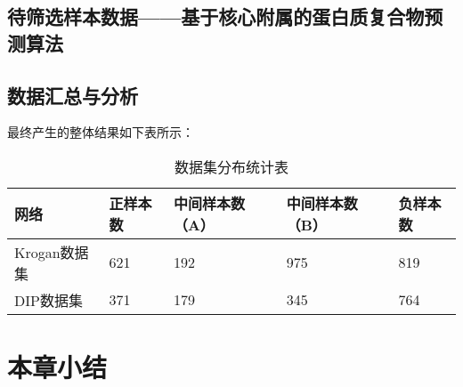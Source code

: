 \subsection{待筛选样本数据——基于核心附属的蛋白质复合物预测算法}
\label{subsection:allSample:coreAttachSampleData}
\subsection{数据汇总与分析}
\label{subsection:allSample:summary}

最终产生的整体结果如下表所示：

\begin{table}[h]
    \centering
    \caption{数据集分布统计表}
    \label{tab:datasets:statistic}
    \begin{tabular}{C{3cm}C{2cm}C{3cm}C{3cm}C{2cm}}
        \toprule
        \textbf{网络} & \textbf{正样本数} & \textbf{中间样本数（A）} & \textbf{中间样本数（B）} & \textbf{负样本数} \\
        \midrule
        Krogan数据集  & 621               & 192                      & 975                      & 819               \\
        DIP数据集     & 371               & 179                      & 345                      & 764               \\
        \bottomrule
    \end{tabular}
\end{table}



\section{本章小结}
\label{section:FeatSubNetworkConstruct:summary}

